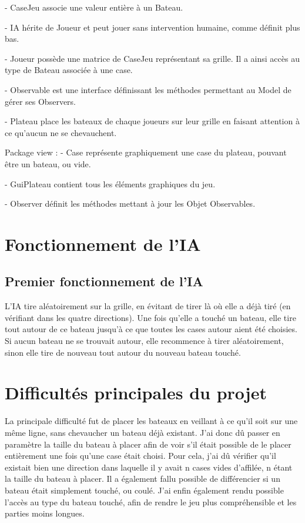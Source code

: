 \documentclass{report}
\begin{document}
- CaseJeu associe une valeur entière à un Bateau.

- IA hérite de Joueur et peut jouer sans intervention humaine, comme définit plus bas.

- Joueur possède une matrice de CaseJeu représentant sa grille. Il a ainsi accès au type de Bateau associée à une case.

- Observable est une interface définissant les méthodes permettant au Model de gérer ses Observers.

- Plateau place les bateaux de chaque joueurs sur leur grille en faisant attention à ce qu'aucun ne se chevauchent.

\medbreak
Package view :
- Case représente graphiquement une case du plateau, pouvant être un bateau, ou vide.

- GuiPlateau contient tous les éléments graphiques du jeu.

- Observer définit les méthodes mettant à jour les Objet Observables.

\chapter{Fonctionnement de l'IA}
\section{Premier fonctionnement de l'IA}
L'IA tire aléatoirement sur la grille, en évitant de tirer là où elle a déjà tiré (en vérifiant dans les quatre directions). Une fois qu'elle a touché un bateau, elle tire tout autour de ce bateau jusqu'à ce que toutes les cases autour aient été choisies. Si aucun bateau ne se trouvait autour, elle recommence à tirer aléatoirement, sinon elle tire de nouveau tout autour du nouveau bateau touché.

\chapter{Difficultés principales du projet}
La principale difficulté fut de placer les bateaux en veillant à ce qu'il soit sur une même ligne, sans chevaucher un bateau déjà existant. J'ai donc dû passer en paramètre la taille du bateau à placer afin de voir s'il était possible de le placer entièrement une fois qu'une case était choisi. Pour cela, j'ai dû vérifier qu'il existait bien une direction dans laquelle il y avait n cases vides d'affilée, n étant la taille du bateau à placer. Il a également fallu possible de différencier si un bateau était simplement touché, ou coulé. J'ai enfin également rendu possible l'accès au type du bateau touché, afin de rendre le jeu plus compréhensible et les parties moins longues.
\end{document}
